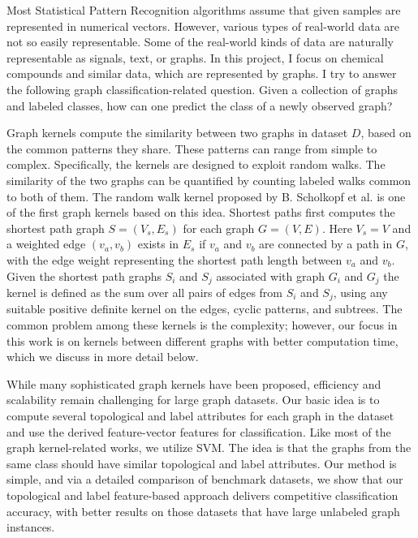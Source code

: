 \documentclass[11pt]{article}
\begin{document}
\begin{flushleft}
{\par{Most Statistical Pattern Recognition algorithms assume that given samples are represented in numerical vectors. However, various types of real-world data are not so easily representable. Some of the real-world kinds of data are naturally representable as signals, text, or graphs. In this project, I focus on chemical compounds and similar data, which are represented by graphs. I try to answer the following graph classification-related question. Given a collection of graphs and labeled classes, how can one predict the class of a newly observed graph?}
\newline 
\par{ Graph kernels compute the similarity between two
graphs in dataset $D$, based on the common patterns they share.
These patterns can range from simple to complex. Specifically, the kernels are designed to exploit random walks. The similarity of the two graphs can be quantified by counting labeled walks common to both of them. The random walk kernel proposed by B. Scholkopf et al. is one of the first graph kernels based on this idea. Shortest paths first computes the shortest path graph $S = (V_{s}, E_{s})$ for each graph $G = (V, E)$. Here $V_{s} = V$ and a weighted edge $(v_{a}, v_{b})$ exists in $E_{s}$ if $v_{a}$ and $v_{b}$ are connected by a path in $G$,
with the edge weight representing the shortest path length between
$v_{a}$ and $v_{b}$. Given the shortest path graphs $S_{i}$ and $S_{j}$ associated with graph $G_{i}$ and $G_{j}$ the kernel is defined as the sum over all pairs of edges from $S_{i}$ and $S_{j}$, using any suitable positive definite kernel on the edges, cyclic patterns, and subtrees. The common problem among these kernels is the complexity; however, our focus in this work is on kernels between different graphs with better computation time, which we discuss in more detail below.
}
\newline 
\par{While many sophisticated graph kernels have been proposed, efficiency and scalability remain challenging for large graph datasets. Our basic idea is to compute several topological and label attributes for each graph in the dataset and use the derived feature-vector features for classification. Like most of the graph kernel-related works, we utilize SVM. The idea is that the graphs from the same class should have similar topological and label attributes. Our method is simple, and via a detailed comparison of benchmark datasets, we show that our topological and label feature-based approach delivers competitive classification accuracy,
with better results on those datasets that have large unlabeled graph instances.
}}
\end{flushleft}
\end{document}
